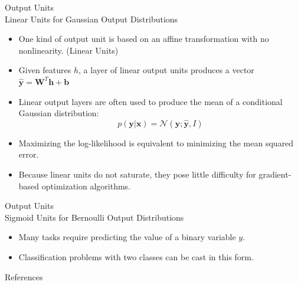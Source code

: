 \documentclass[10pt]{beamer}
\begin{document}
	\begin{frame}{Output Units\\ Linear Units for Gaussian Output Distributions}
		\begin{itemize}
			\item One kind of output unit is based on an affine transformation with no nonlinearity. (Linear Units)
			\item Given features $h$, a layer of linear output units produces a vector $\hat{\bm{y}}=\bm{W}^T\bm{h}+\bm{b}$
			\item Linear output layers are often used to produce the mean of a conditional Gaussian distribution:
			$$p(\bm{y}|\bm{x})=\mathcal{N}(\bm{y};\hat{\bm{y}},\mathit{I})$$
			\item Maximizing the log-likelihood is equivalent to minimizing the mean squared error.
			\item Because linear units do not saturate, they pose little difficulty for gradient-based optimization algorithms.
		\end{itemize}
	\end{frame}

	\begin{frame}{Output Units\\ Sigmoid Units for Bernoulli Output Distributions}
		\begin{itemize}
			\item Many tasks require predicting the value of a binary variable $y$.
			\item Classification problems with two classes can be cast in this form.
		\end{itemize}
	\end{frame}
	


	\begin{frame}[allowframebreaks]{References}
		
		
	\end{frame}
\end{document}
